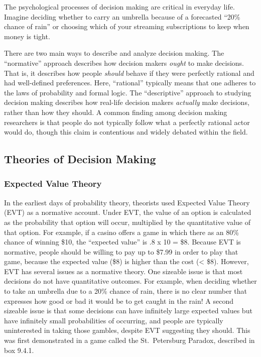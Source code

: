 \documentclass[
]{krantz}
\begin{document}
The psychological processes of decision making are critical in everyday life. Imagine deciding whether to carry an umbrella because of a forecasted ``20\% chance of rain'' or choosing which of your streaming subscriptions to keep when money is tight.

There are two main ways to describe and analyze decision making. The ``normative'' approach describes how decision makers \emph{ought} to make decisions. That is, it describes how people \emph{should} behave if they were perfectly rational and had well-defined preferences. Here, ``rational'' typically means that one adheres to the laws of probability and formal logic. The ``descriptive'' approach to studying decision making describes how real-life decision makers \emph{actually} make decisions, rather than how they should. A common finding among decision making researchers is that people do not typically follow what a perfectly rational actor would do, though this claim is contentious and widely debated within the field.

\subsection*{Theories of Decision Making}\label{theories-of-decision-making}


\subsubsection*{Expected Value Theory}\label{expected-value-theory}


In the earliest days of probability theory, theorists used Expected Value Theory (EVT) as a normative account. Under EVT, the value of an option is calculated as the probability that option will occur, multiplied by the quantitative value of that option. For example, if a casino offers a game in which there as an 80\% chance of winning \$10, the ``expected value'' is .8 x 10 = \$8. Because EVT is normative, people should be willing to pay up to \$7.99 in order to play that game, because the expected value (\$8) is higher than the cost (\textless{} \$8). However, EVT has several issues as a normative theory. One sizeable issue is that most decisions do not have quantitative outcomes. For example, when deciding whether to take an umbrella due to a 20\% chance of rain, there is no clear number that expresses how good or bad it would be to get caught in the rain! A second sizeable issue is that some decisions can have infinitely large expected values but have infinitely small probabilities of occurring, and people are typically uninterested in taking those gambles, despite EVT suggesting they should. This was first demonstrated in a game called the St.~Petersburg Paradox, described in box 9.4.1.
\end{document}
